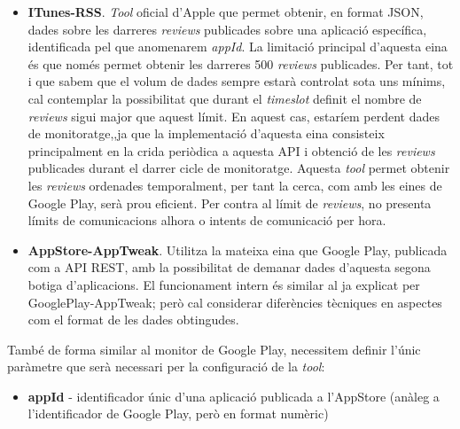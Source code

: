 \begin{itemize}
\item \textbf{ITunes-RSS}. \textit{Tool} oficial d'Apple que permet obtenir, en format JSON, dades sobre les darreres \textit{reviews} publicades sobre una aplicació específica, identificada pel que anomenarem \textit{appId}. La limitació principal d'aquesta eina és que només permet obtenir les darreres 500 \textit{reviews} publicades. Per tant, tot i que sabem que el volum de dades sempre estarà controlat sota uns mínims, cal contemplar la possibilitat que durant el \textit{timeslot} definit el nombre de \textit{reviews} sigui major que aquest límit. En aquest cas, estaríem perdent dades de monitoratge,,ja que la implementació d'aquesta eina consisteix principalment en la crida periòdica a aquesta API i obtenció de les \textit{reviews} publicades durant el darrer cicle de monitoratge. Aquesta \textit{tool} permet obtenir les \textit{reviews} ordenades temporalment, per tant la cerca, com amb les eines de Google Play, serà prou eficient. Per contra al límit de \textit{reviews}, no presenta límits de comunicacions alhora o intents de comunicació per hora.
\item \textbf{AppStore-AppTweak}. Utilitza la mateixa eina que Google Play, publicada com a API REST, amb la possibilitat de demanar dades d'aquesta segona botiga d'aplicacions. El funcionament intern és similar al ja explicat per GooglePlay-AppTweak; però cal considerar diferències tècniques en aspectes com el format de les dades obtingudes.
\end{itemize}

També de forma similar al monitor de Google Play, necessitem definir l'únic paràmetre que serà necessari per la configuració de la \textit{tool}:

\begin{itemize}
\item \textbf{appId} - identificador únic d'una aplicació publicada a l'AppStore (anàleg a l'identificador de Google Play, però en format numèric)
\end{itemize}

